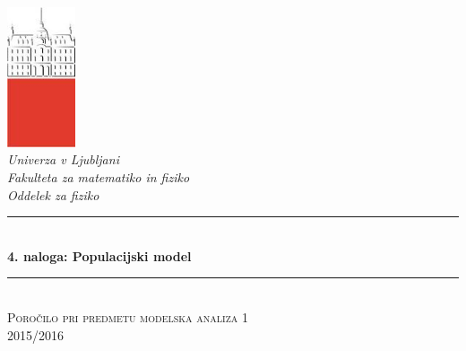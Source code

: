 \documentclass[slovene,11pt,a4paper]{article}
\numberwithin{equation}{section} %
\numberwithin{figure}{section} %
\numberwithin{table}{section} %
\begin{document}
\begin{titlepage}

\newcommand{\HRule}{\rule{\linewidth}{0.5mm}} %

\center %


 

\includegraphics[width=2cm]{slike/aaa}\\[0.5cm]
 
\textit{Univerza v Ljubljani}\\
\textit{Fakulteta za {\color{red}matematiko in fiziko}}\\[0.5cm]

\emph{Oddelek za fiziko}\\[0.5cm] %


\HRule \\[0.4cm]
\huge {\bfseries 4. naloga: Populacijski model}\\[0.4cm] %
\HRule \\[0.5cm] 

 \textsc{\large Poročilo pri predmetu modelska analiza 1}\\
 \textsc{\large 2015/2016}\\[1cm] %
 

\end{titlepage}
\end{document}
